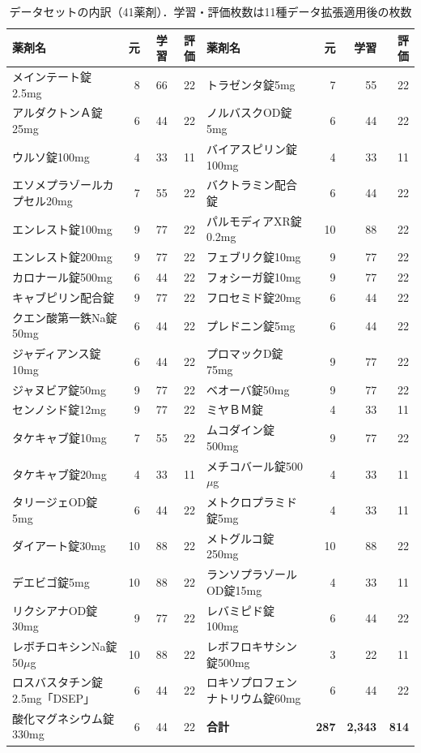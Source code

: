 \documentclass[dvipdfmx]{jsarticle}
\begin{document}
\begin{table}[htbp]
\centering
\caption{データセットの内訳（41薬剤）．学習・評価枚数は11種データ拡張適用後の枚数}
\label{tab:dataset}
\scriptsize
\setlength{\tabcolsep}{3pt}
\begin{tabular}{lrrr|lrrr}
\hline
薬剤名 & 元 & 学習 & 評価 & 薬剤名 & 元 & 学習 & 評価 \\
\hline
メインテート錠2.5mg & 8 & 66 & 22 & トラゼンタ錠5mg & 7 & 55 & 22 \\
アルダクトンＡ錠25mg & 6 & 44 & 22 & ノルバスクOD錠5mg & 6 & 44 & 22 \\
ウルソ錠100mg & 4 & 33 & 11 & バイアスピリン錠100mg & 4 & 33 & 11 \\
エソメプラゾールカプセル20mg & 7 & 55 & 22 & バクトラミン配合錠 & 6 & 44 & 22 \\
エンレスト錠100mg & 9 & 77 & 22 & パルモディアXR錠0.2mg & 10 & 88 & 22 \\
エンレスト錠200mg & 9 & 77 & 22 & フェブリク錠10mg & 9 & 77 & 22 \\
カロナール錠500mg & 6 & 44 & 22 & フォシーガ錠10mg & 9 & 77 & 22 \\
キャブピリン配合錠 & 9 & 77 & 22 & フロセミド錠20mg & 6 & 44 & 22 \\
クエン酸第一鉄Na錠50mg & 6 & 44 & 22 & プレドニン錠5mg & 6 & 44 & 22 \\
ジャディアンス錠10mg & 6 & 44 & 22 & プロマックD錠75mg & 9 & 77 & 22 \\
ジャヌビア錠50mg & 9 & 77 & 22 & ベオーバ錠50mg & 9 & 77 & 22 \\
センノシド錠12mg & 9 & 77 & 22 & ミヤＢＭ錠 & 4 & 33 & 11 \\
タケキャブ錠10mg & 7 & 55 & 22 & ムコダイン錠500mg & 9 & 77 & 22 \\
タケキャブ錠20mg & 4 & 33 & 11 & メチコバール錠500$\mu$g & 4 & 33 & 11 \\
タリージェOD錠5mg & 6 & 44 & 22 & メトクロプラミド錠5mg & 4 & 33 & 11 \\
ダイアート錠30mg & 10 & 88 & 22 & メトグルコ錠250mg & 10 & 88 & 22 \\
デエビゴ錠5mg & 10 & 88 & 22 & ランソプラゾールOD錠15mg & 4 & 33 & 11 \\
リクシアナOD錠30mg & 9 & 77 & 22 & レバミピド錠100mg & 6 & 44 & 22 \\
レボチロキシンNa錠50$\mu$g & 10 & 88 & 22 & レボフロキサシン錠500mg & 3 & 22 & 11 \\
ロスバスタチン錠2.5mg「DSEP」 & 6 & 44 & 22 & ロキソプロフェンナトリウム錠60mg & 6 & 44 & 22 \\
酸化マグネシウム錠330mg & 6 & 44 & 22 & \textbf{合計} & \textbf{287} & \textbf{2,343} & \textbf{814} \\
\hline
\end{tabular}
\end{table}
\end{document}
